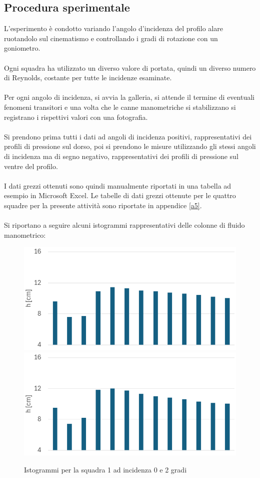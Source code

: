 \subsection{Procedura sperimentale}
L'esperimento è condotto variando l'angolo d'incidenza del profilo alare ruotandolo sul cinematismo e controllando i gradi di rotazione con un goniometro.\\\\
Ogni squadra ha utilizzato un diverso valore di portata, quindi un diverso numero di Reynolds, costante per tutte le incidenze esaminate.\\\\
Per ogni angolo di incidenza, si avvia la galleria, si attende il termine di eventuali fenomeni transitori e una volta che le canne manometriche si stabilizzano si registrano i rispettivi valori con una fotografia.\\\\
Si prendono prima tutti i dati ad angoli di incidenza positivi, rappresentativi dei profili di pressione sul dorso, poi si prendono le misure utilizzando gli stessi angoli di incidenza ma di segno negativo, rappresentativi dei profili di pressione sul ventre del profilo.\\\\
I dati grezzi ottenuti sono quindi manualmente riportati in una tabella ad esempio in Microsoft Excel. Le tabelle di dati grezzi ottenute per le quattro squadre per la presente attività sono riportate in appendice \ref{a5}.\\\\
Si riportano a seguire alcuni istogrammi rappresentativi delle colonne di fluido manometrico:
\begin{figure}[H]
    \centering
    \includegraphics[width=.49\textwidth]{images/5/dsq1a0.png}
    \includegraphics[width=.49\textwidth]{images/5/dsq1a2.png}
    \caption{Istogrammi per la squadra 1 ad incidenza 0 e 2 gradi}
\end{figure}

